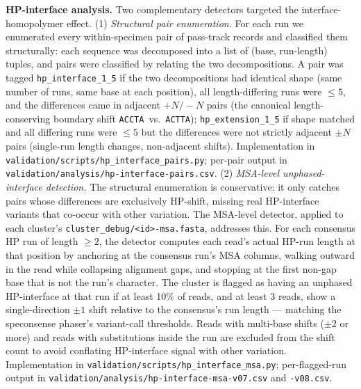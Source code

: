 \documentclass[11pt]{article}
\begin{document}
\textbf{HP-interface analysis.} Two complementary detectors targeted
the interface-homopolymer effect. (1) \emph{Structural pair
enumeration.} For each run we enumerated every within-specimen pair
of pass-track records and classified them structurally: each sequence
was decomposed into a list of (base, run-length) tuples, and pairs
were classified by relating the two decompositions. A pair was tagged
\texttt{hp\_interface\_1\_5} if the two decompositions had identical
shape (same number of runs, same base at each position), all
length-differing runs were $\leq 5$, and the differences came in
adjacent $+N/-N$ pairs (the canonical length-conserving boundary shift
\texttt{ACCTA}~vs.~\texttt{ACTTA}); \texttt{hp\_extension\_1\_5} if
shape matched and all differing runs were $\leq 5$ but the differences
were not strictly adjacent $\pm N$ pairs (single-run length changes,
non-adjacent shifts). Implementation in
\texttt{validation/scripts/hp\_interface\_pairs.py}; per-pair output
in \texttt{validation/analysis/hp-interface-pairs.csv}.
(2) \emph{MSA-level unphased-interface detection.} The structural
enumeration is conservative: it only catches pairs whose differences
are exclusively HP-shift, missing real HP-interface variants that
co-occur with other variation. The MSA-level detector, applied to
each cluster's \texttt{cluster\_debug/<id>-msa.fasta}, addresses this.
For each consensus HP run of length $\geq 2$, the detector computes
each read's actual HP-run length at that position by anchoring at
the consensus run's MSA columns, walking outward in the read while
collapsing alignment gaps, and stopping at the first non-gap base
that is not the run's character. The cluster is flagged as having an
unphased HP-interface at that run if at least 10\% of reads, and at
least 3 reads, show a single-direction $\pm 1$ shift relative to the
consensus's run length --- matching the speconsense phaser's
variant-call thresholds. Reads with multi-base shifts ($\pm 2$ or
more) and reads with substitutions inside the run are excluded from
the shift count to avoid conflating HP-interface signal with other
variation. Implementation in
\texttt{validation/scripts/hp\_interface\_msa.py}; per-flagged-run
output in
\texttt{validation/analysis/hp-interface-msa-v07.csv} and
\texttt{-v08.csv}.
\end{document}
